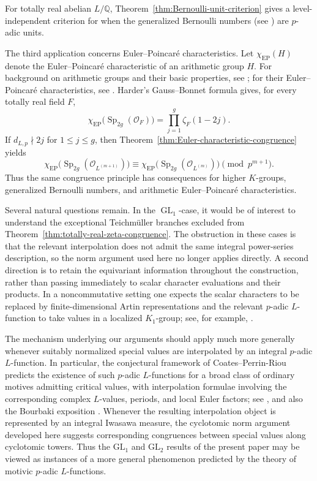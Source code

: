 \documentclass[11pt,table]{amsart}
\newcommand{\Q}{\mathbb{Q}}
\newcommand{\op}[1]{\operatorname{#1}}
\numberwithin{equation}{section}
\begin{document}
\par For totally real abelian $L/\Q$, Theorem~\ref{thm:Bernoulli-unit-criterion} gives a level-independent criterion for when the generalized Bernoulli numbers (see \cite[Chapter~4]{Washington1997}) are $p$-adic units.


\par The third application concerns Euler--Poincar\'e characteristics. Let \(\chi_{\mathrm{EP}}(H)\) denote the Euler--Poincar\'e
characteristic of an arithmetic group \(H\). For
background on arithmetic groups and their basic properties, see
\cite{BorelArithmeticGroups,PlatonovRapinchuk}; for their
Euler--Poincar\'e characteristics, see \cite{Harder1971}. Harder's Gauss--Bonnet formula \cite{Harder1971} gives, for every
totally real field \(F\),
\[
        \chi_{\mathrm{EP}}
        \bigl(\operatorname{Sp}_{2g}(\mathcal O_F)\bigr)
        =
        \prod_{j=1}^{g}\zeta_F(1-2j).
\]If
\(d_{L,p}\nmid 2j\) for \(1\leq j\leq g\), then
Theorem~\ref{thm:Euler-characteristic-congruence} yields
\[
        \chi_{\mathrm{EP}}
        \bigl(\operatorname{Sp}_{2g}(\mathcal O_{L^{(m+1)}})\bigr)
        \equiv
        \chi_{\mathrm{EP}}
        \bigl(\operatorname{Sp}_{2g}(\mathcal O_{L^{(m)}})\bigr)
        \pmod{p^{m+1}}.
\]
Thus the same congruence principle has consequences for higher
\(K\)-groups, generalized Bernoulli numbers, and arithmetic
Euler--Poincar\'e characteristics.

\par Several natural questions remain. In the $\op{GL}_1$-case, it would be
of interest to understand the exceptional Teichm\"uller branches excluded
from Theorem~\ref{thm:totally-real-zeta-congruence}. The obstruction in
these cases is that the relevant interpolation does not admit the same
integral power-series description, so the norm argument used here no
longer applies directly. A second direction is to retain the
equivariant information throughout the construction, rather than passing
immediately to scalar character evaluations and their products.  In a noncommutative setting one expects the scalar
characters to be replaced by finite-dimensional Artin representations
and the relevant \(p\)-adic \(L\)-function to take values in a localized
\(K_1\)-group; see, for example, \cite{SujathaReductions}.
\par The mechanism underlying our arguments should apply much more
generally whenever suitably normalized special values are interpolated by
an integral $p$-adic $L$-function.  In particular, the conjectural
framework of Coates--Perrin-Riou predicts the existence of such
$p$-adic $L$-functions for a broad class of ordinary motives admitting
critical values, with interpolation formulae involving the corresponding
complex $L$-values, periods, and local Euler factors; see
\cite{CoatesPerrinRiou,CoatesMotivesII}, and also the Bourbaki
exposition \cite{CoatesBourbaki}.  Whenever the resulting interpolation
object is represented by an integral Iwasawa measure, the cyclotomic
norm argument developed here suggests corresponding congruences between
special values along cyclotomic towers.  Thus the $\mathrm{GL}_1$ and
$\mathrm{GL}_2$ results of the present paper may be viewed as instances
of a more general phenomenon predicted by the theory of motivic
$p$-adic $L$-functions.
\end{document}
